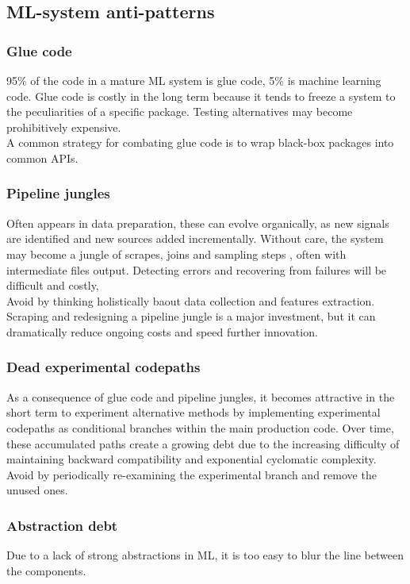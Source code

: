 \documentclass{report}
\begin{document}
\subsection{ML-system anti-patterns}
\subsubsection{Glue code}
95\% of the code in a mature ML system is glue code, 5\% is machine learning code. Glue code is costly
in the long term because it tends to freeze a system to the peculiarities of a specific package. Testing
alternatives may become prohibitively expensive. \\
A common strategy for combating glue code is to wrap black-box packages into common APIs.

\subsubsection{Pipeline jungles}
Often appears in data preparation, these can evolve organically, as new signals are identified and new
sources added incrementally. Without care, the system may become a jungle of scrapes, joins and sampling steps
, often with intermediate files output. Detecting errors and recovering from failures will be difficult
and costly, \\
Avoid by thinking holistically baout data collection and features extraction. Scraping and redesigning
a pipeline jungle is a major investment, but it can dramatically reduce ongoing costs and speed further
innovation.

\subsubsection{Dead experimental codepaths}
As a consequence of glue code and pipeline jungles, it becomes attractive in the short term to
experiment alternative methods by implementing experimental codepaths as conditional branches within
the main production code. Over time, these accumulated paths create a growing debt due to the increasing
difficulty of maintaining backward compatibility and exponential cyclomatic complexity.\\
Avoid by periodically re-examining the experimental branch and remove the unused ones.

\subsubsection{Abstraction debt}
Due to a lack of strong abstractions in ML, it is too easy to blur the line between the components.
\end{document}

